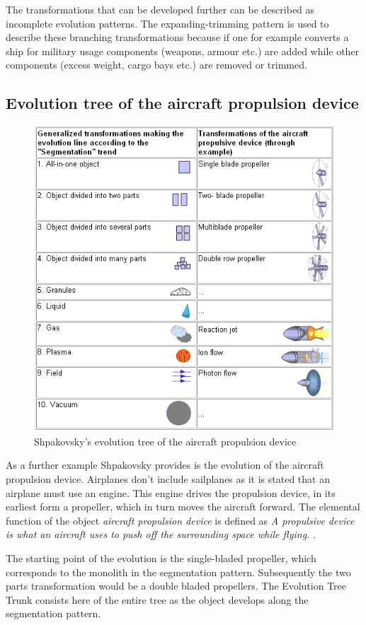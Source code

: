 \documentclass[11pt,a4paper]{article}
\begin{document}
The transformations that can be developed further can be described as
incomplete evolution patterns. The expanding-trimming pattern is used to
describe these branching transformations because if one for example converts a
ship for military usage components (weapons, armour etc.) are added while
other components (excess weight, cargo bays etc.) are removed or trimmed.

\subsection{Evolution tree of the aircraft propulsion device}

\begin{figure}[htb]
  \centering
  \includegraphics[width=0.75\linewidth]{figures/aircraft.png}
  \caption{\small Shpakovsky's evolution tree of the aircraft propulsion
    device \cite{Shpakovsky2003}}
	\label{fig:aircraft}
\end{figure}

As a further example Shpakovsky provides is the evolution of the aircraft
propulsion device. Airplanes don't include sailplanes as it is stated that an
airplane must use an engine. This engine drives the propulsion device, in its
earliest form a propeller, which in turn moves the aircraft forward. The
elemental function of the object \textit{aircraft propulsion device} is
defined as \textit{A propulsive device is what an aircraft uses to push off
  the surrounding space while flying.} \cite{Shpakovsky2003}.

The starting point of the evolution is the single-bladed propeller, which
corresponds to the monolith in the segmentation pattern. Subsequently the two
parts transformation would be a double bladed propellers. The Evolution Tree
Trunk consists here of the entire tree as the object develops along the
segmentation pattern.
\end{document}
